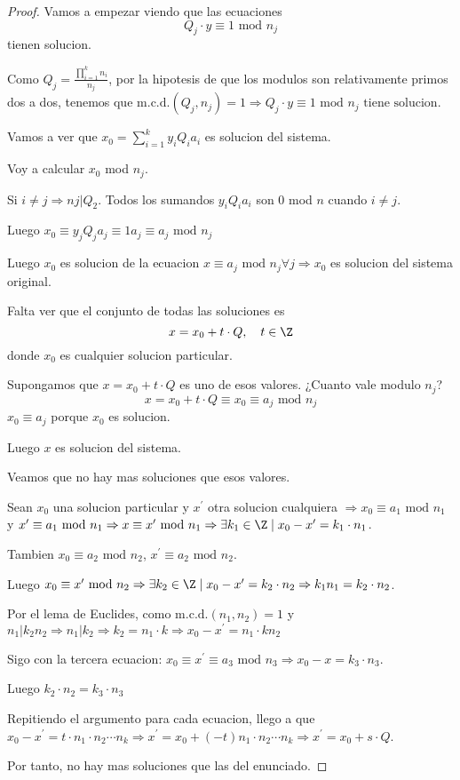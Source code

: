 \begin{proof}
	Vamos a empezar viendo que las ecuaciones
	\[
		Q_j \cdot y \equiv 1 \text{ mod } n_j
	\]
	tienen solucion.

	Como \(Q_j = \frac{\prod\limits_{i =1}^{k } n_i}{n_j} \), por la hipotesis de que los modulos son relativamente primos dos a dos, tenemos que \(\mathrm{m.c.d.}(Q_j,n_j ) = 1 \Rightarrow Q_j \cdot y \equiv 1 \text{ mod } n_j \text{ tiene solucion}  \).

	Vamos a ver que \(x_0 = \sum_{i=1}^{k } y_i Q_i a_i \) es solucion del sistema.

	Voy a calcular \(x_0 \) mod \(n_j \).

	Si \(i \neq j \Rightarrow nj |Q_2 \). Todos los sumandos \(y_i Q_i a_i \) son 0 mod \( n \) cuando \(i \neq j \).

	Luego \(x_0 \equiv y_j Q_j a_j \equiv 1 a_j \equiv a_j \text{ mod } n_j  \)

	Luego \(x_0 \) es solucion de la ecuacion \(x \equiv a_j \text{ mod } n_j \forall j \Rightarrow x_{0}\) es solucion del sistema original.

	Falta ver que el conjunto de todas las soluciones es
	\[
		x = x_0 + t \cdot Q, \quad t \in \Z
	\]
	donde \(x_0 \) es cualquier solucion particular.

	Supongamos que \(x = x_0 + t \cdot Q \) es uno de esos valores.
	¿Cuanto vale modulo \(n_j\)?
	\[
		x = x_0 + t \cdot Q \equiv x_0 \equiv a_j \text{ mod } n_j
	\]
	\(x_0 \equiv a_j \) porque \(x_0 \) es solucion.

	Luego \(x \) es solucion del sistema.

	\vspace{0.1cm}
	Veamos que no hay mas soluciones que esos valores.

	Sean \(x_0 \) una solucion particular y \(x^\prime  \) otra solucion cualquiera \(\Rightarrow x_0 \equiv a_1 \text{ mod }n_1  \) y \(x^\prime  \equiv a_1 \text{ mod } n_1 \Rightarrow x \equiv x^\prime \text{ mod } n_1 \Rightarrow \exists k_1 \in \Z \mid  x_0 - x^\prime = k_1 \cdot n_1 \).

	Tambien \(x_0 \equiv a_2 \text{ mod } n_2 \), \(x^\prime  \equiv a_2 \text{ mod } n_2 \).

	Luego \(x_0 \equiv x^\prime \text{ mod }n_2 \Rightarrow \exists k_2 \in \Z \mid x_0 - x^\prime = k_2 \cdot n_2 \Rightarrow k_1 n_1 = k_2 \cdot n_2\).

	Por el lema de Euclides, como \(\mathrm{m.c.d.}(n_1,n_2) = 1  \) y \(n_1 | k_2 n_2 \Rightarrow n_1 | k_2 \Rightarrow k_2 = n_1 \cdot k \Rightarrow x_0 - x^\prime = n_1 \cdot k n_2 \)

	Sigo con la tercera ecuacion: \(x_0 \equiv x^\prime \equiv a_3 \text{ mod } n_3 \Rightarrow x_0 - x = k_3 \cdot n_3\).

	Luego \(k_2 \cdot n_2 = k_3 \cdot n_3 \)

	Repitiendo el argumento para cada ecuacion, llego a que \(x_0 - x^\prime = t \cdot n_1 \cdot n_2 \cdots n_k \Rightarrow x^\prime  = x_0 + (-t) n_1 \cdot n_2 \cdots n_k \Rightarrow x^\prime = x_0 + s \cdot Q 	\).

	Por tanto, no hay mas soluciones que las del enunciado.
\end{proof}

